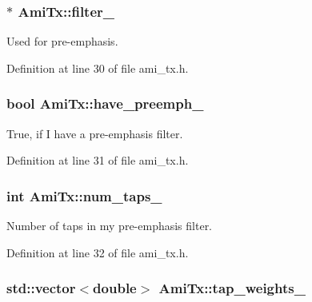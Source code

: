 \subsubsection[{filter\+\_\+}]{$\ast$ Ami\+Tx\+::filter\+\_\+\hspace{0.3cm}{\ttfamily [protected]}}\label{class_ami_tx_a1eb407f2a0aa1010c5d381c172f8425d}


Used for pre-\/emphasis. 



Definition at line 30 of file ami\+\_\+tx.\+h.

\hypertarget{class_ami_tx_a8e07817524a3626aaa432bcbe7cad30f}{}
\subsubsection[{have\+\_\+preemph\+\_\+}]{\setlength{\rightskip}{0pt plus 5cm}bool Ami\+Tx\+::have\+\_\+preemph\+\_\+\hspace{0.3cm}{\ttfamily [protected]}}\label{class_ami_tx_a8e07817524a3626aaa432bcbe7cad30f}


True, if I have a pre-\/emphasis filter. 



Definition at line 31 of file ami\+\_\+tx.\+h.

\hypertarget{class_ami_tx_a166891685483a94632bbcd4e2afebf88}{}
\subsubsection[{num\+\_\+taps\+\_\+}]{\setlength{\rightskip}{0pt plus 5cm}int Ami\+Tx\+::num\+\_\+taps\+\_\+\hspace{0.3cm}{\ttfamily [protected]}}\label{class_ami_tx_a166891685483a94632bbcd4e2afebf88}


Number of taps in my pre-\/emphasis filter. 



Definition at line 32 of file ami\+\_\+tx.\+h.

\hypertarget{class_ami_tx_ab4878fcf087a793ca120ab1e30cabed5}{}
\subsubsection[{tap\+\_\+weights\+\_\+}]{\setlength{\rightskip}{0pt plus 5cm}std\+::vector$<$double$>$ Ami\+Tx\+::tap\+\_\+weights\+\_\+\hspace{0.3cm}{\ttfamily [protected]}}\label{class_ami_tx_ab4878fcf087a793ca120ab1e30cabed5}


